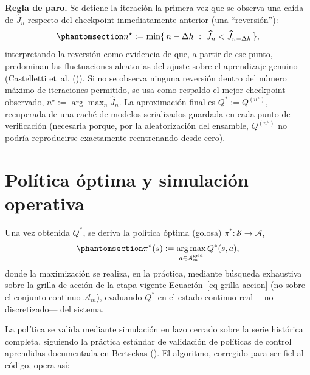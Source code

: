 \documentclass[
  spanish,
  letterpaper,
]{scrreprt}
\theoremstyle{definition}
\theoremstyle{remark}
\begin{document}
\textbf{Regla de paro.} Se detiene la iteración la primera vez que se
observa una caída de \(\widehat J_n\) respecto del checkpoint
inmediatamente anterior (una ``reversión''):
\begin{equation}\protect\phantomsection\label{eq-criterio-paro}{n^\star := \min\{\, n-\Delta h \ :\ \widehat J_{n} < \widehat J_{n-\Delta h} \,\},}\end{equation}
interpretando la reversión como evidencia de que, a partir de ese punto,
predominan las fluctuaciones aleatorias del ajuste sobre el aprendizaje
genuino (Castelletti et~al. ()). Si
no se observa ninguna reversión dentro del número máximo de iteraciones
permitido, se usa como respaldo el mejor checkpoint observado,
\(n^\star:=\arg\max_n \widehat J_n\). La aproximación final es
\(Q^{*}:=Q^{(n^\star)}\), recuperada de una caché de modelos
serializados guardada en cada punto de verificación (necesaria porque,
por la aleatorización del ensamble, \(Q^{(n^\star)}\) no podría
reproducirse exactamente reentrenando desde cero).

\section{Política óptima y simulación operativa}\label{sec-simulacion}

Una vez obtenida \(Q^{*}\), se deriva la política óptima (golosa)
\(\pi^{*}:\mathcal S\to\mathcal A\),
\begin{equation}\protect\phantomsection\label{eq-politica-optima}{\pi^{*}(s) := \operatorname*{arg\,max}_{a\in\mathcal A_m^{\text{grid}}} Q^{*}(s,a),}\end{equation}
donde la maximización se realiza, en la práctica, mediante búsqueda
exhaustiva sobre la grilla de acción de la etapa vigente
Ecuación~\ref{eq-grilla-accion} (no sobre el conjunto continuo
\(\mathcal A_m\)), evaluando \(Q^{*}\) en el estado continuo real ---no
discretizado--- del sistema.

La política se valida mediante simulación en lazo cerrado sobre la serie
histórica completa, siguiendo la práctica estándar de validación de
políticas de control aprendidas documentada en Bertsekas
(). El algoritmo, corregido para ser
fiel al código, opera así:
\end{document}
